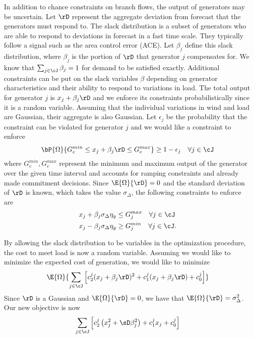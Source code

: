 In addition to chance constraints on branch flows, the output of generators may be uncertain.  Let $\rD$ represent the aggregate deviation from forecast that the generators must respond to.   The slack distribution is a subset of generators who are able to respond to deviations in forecast in a fast time scale.  They typically follow a signal such as the area control error (ACE).  Let $\beta_j$ define this slack distribution, where $\beta_j$ is the portion of $\rD$ that generator $j$ compensates for.  We know that $\sum_{j \in \cJ} \beta_j =1$ for demand to be satisfied exactly.  Additional constraints can be put on the slack variables $\beta$ depending on generator characteristics and their ability to respond to variations in load.  The total output for generator $j$ is $x_j + \beta_j \rD $
and we enforce its constraints probabilistically since it is a random variable.  Assuming that the individual variations in wind and load are Gaussian, their aggregate is also Gaussian.   Let $\epsilon_j$ be the probability that the constraint can be violated for generator $j$ and we would like a constraint to enforce
\begin{equation}\label{eq_cc_gen}
\bP{\Omega}{ G^{min}_e \leq x_j + \beta_j \rD  \leq G^{max}_e } \geq 1 - \epsilon_j \hspace{10px} \forall j \in \cJ 
\end{equation}
where $G^{min}_e, G^{max}_e$ represent the minimum and maximum output of the generator over the given time interval and accounts for ramping constraints and already made commitment decisions. Since $\E{\Omega}{\rD} = 0$ and the standard deviation of $\rD$ is known, which takes the value $\sigma_\Delta$, the following constraints to enforce  are
\begin{align*}
x_j + \beta_j \sigma_\Delta \eta_g &\leq G^{max}_j \hspace{10px} \forall j \in \cJ \\
x_j - \beta_j \sigma_\Delta \eta_g &\geq G^{min}_j \hspace{10px} \forall j \in \cJ .
\end{align*}

By allowing the slack distribution to be variables in the optimization procedure, the cost to meet load is now a random variable.  Assuming we would like to minimize the expected cost of generation, we would like to minimize
\begin{equation*}
\E{\Omega}{ \sum_{j \in \cJ} \left[ c^j_2 (x_j+\beta_j \rD)^2 + c^j_1 (x_j + \beta_j \rD) + c_0^j \right] }
\end{equation*}
Since $\rD$ is a Gaussian and $\E{\Omega}{\rD} = 0$, we have that $\E{\Omega}{\rD} = \sigma_\Delta^2$.  Our new objective is now
\begin{equation*}
\sum_{j \in \cJ} \left[  c_2^j \left(x_j^2 + \sD \beta_j^2 \right) + c^j_1 x_j + c^j_0 \right]
\end{equation*}


